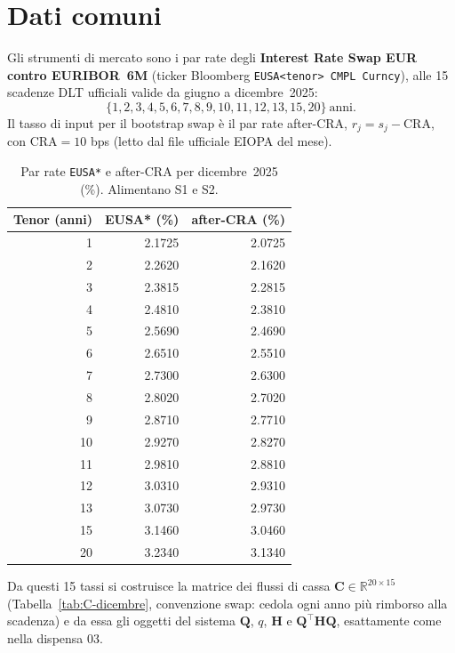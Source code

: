 \documentclass[11pt,a4paper]{article}
\theoremstyle{remark}
\newcommand{\CRA}{\ensuremath{\mathrm{CRA}}}
\newcommand{\Qmat}{\mathbf{Q}}
\newcommand{\Hmat}{\mathbf{H}}
\newcommand{\transp}{^{\!\top}}
\begin{document}
\section{Dati comuni}
\label{sec:dati-comuni}

Gli strumenti di mercato sono i par rate degli \textbf{Interest Rate Swap EUR contro
EURIBOR~6M} (ticker Bloomberg \texttt{EUSA<tenor> CMPL Curncy}), alle 15 scadenze DLT
ufficiali valide da giugno a dicembre~2025:
\[
  \{1,2,3,4,5,6,7,8,9,10,11,12,13,15,20\}\ \text{anni}.
\]
Il tasso di input per il bootstrap swap \`e il par rate after-CRA, $r_j = s_j - \CRA$, con
$\CRA = 10$ bps (letto dal file ufficiale EIOPA del mese).

\begin{table}[H]
\centering
\small
\begin{tabular}{rrr}
\toprule
Tenor (anni) & EUSA* (\%) & after-CRA (\%) \\
\midrule
1  & 2.1725 & 2.0725 \\
2  & 2.2620 & 2.1620 \\
3  & 2.3815 & 2.2815 \\
4  & 2.4810 & 2.3810 \\
5  & 2.5690 & 2.4690 \\
6  & 2.6510 & 2.5510 \\
7  & 2.7300 & 2.6300 \\
8  & 2.8020 & 2.7020 \\
9  & 2.8710 & 2.7710 \\
10 & 2.9270 & 2.8270 \\
11 & 2.9810 & 2.8810 \\
12 & 3.0310 & 2.9310 \\
13 & 3.0730 & 2.9730 \\
15 & 3.1460 & 3.0460 \\
20 & 3.2340 & 3.1340 \\
\bottomrule
\end{tabular}
\caption{Par rate \texttt{EUSA*} e after-CRA per dicembre~2025 (\%). Alimentano S1 e S2.}
\label{tab:input-eusa}
\end{table}

Da questi 15 tassi si costruisce la matrice dei flussi di cassa
$\mathbf{C}\in\mathbb{R}^{20\times 15}$ (Tabella~\ref{tab:C-dicembre}, convenzione swap:
cedola ogni anno pi\`u rimborso alla scadenza) e da essa gli oggetti del sistema $\Qmat$, $q$,
$\Hmat$ e $\Qmat\transp\Hmat\Qmat$, esattamente come nella dispensa 03.
\end{document}
